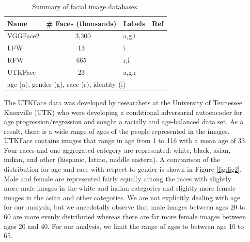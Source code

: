 \documentclass[obeyspaces, spaces, fleqn,10pt]{SelfArx} %
\begin{document}
\begin{table}[hbt]
\caption{Summary of facial image databases.}
\centering
\begin{tabular}{lclc}
\toprule
Name & \# Faces (thousands) & Labels & Ref \\
\midrule
VGGFace2 & ~3,300 & a,g,i & \cite{Cao18} \\
LFW & 13 & i & \cite{LFWTech} \\
RFW & 665 & r,i & \cite{wang:2018} \\
UTKFace & 23 & a,g,r & \cite{utkface} \\
\bottomrule
\multicolumn{4}{l}{age (a), gender (g), race (r), identity (i)} \\
\end{tabular}
\label{tab:tab1}
\end{table}

The UTKFace data was developed by researchers at the University of Tennessee Knoxville (UTK) who were developing a conditional adversarial autoencoder for age progression/regression and sought a racially and age-balanced data set.\cite{utkface} As a result, there is a wide range of ages of the people represented in the images. UTKFace contains images that range in age from 1 to 116 with a mean age of 33. Four races and one aggregated category are represented: white, black, asian, indian, and other (hispanic, latino, middle eastern). A comparison of the distribution for age and race with respect to gender is shown in Figure \ref{fig:fig2}. Male and female are represented fairly equally among the races with slightly more male images in the white and indian categories and slightly more female images in the asian and other categories. We are not explicitly dealing with age for our analysis, but we anecdotally observe that male images between ages 20 to 60 are more evenly distributed whereas there are far more female images between ages 20 and 40. For our analysis, we limit the range of ages to between age 10 to 65. 
\end{document}
